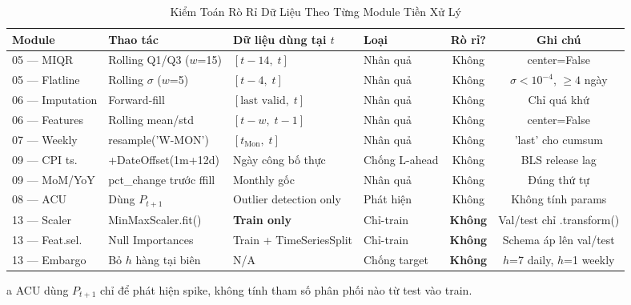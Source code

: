 \documentclass[conference]{IEEEtran}
\begin{document}
\begin{table}[t]
\caption{Kiểm Toán Rò Rỉ Dữ Liệu Theo Từng Module Tiền Xử Lý}
\label{tab:leakage_audit}
\centering
\begin{threeparttable}
\begin{tabular}{@{}llllcc@{}}
\toprule
\textbf{Module} & \textbf{Thao tác} & \textbf{Dữ liệu dùng tại $t$}
  & \textbf{Loại} & \textbf{Rò rỉ?} & \textbf{Ghi chú} \\
\midrule
05 --- MIQR      & Rolling Q1/Q3 ($w$=15)   & $[t{-}14,\;t]$             & Nhân quả     & Không & center=False \\
05 --- Flatline  & Rolling $\sigma$ ($w$=5)  & $[t{-}4,\;t]$              & Nhân quả     & Không & $\sigma < 10^{-4}$, $\geq 4$ ngày \\
06 --- Imputation& Forward-fill             & $[\text{last valid},\;t]$  & Nhân quả     & Không & Chỉ quá khứ \\
06 --- Features  & Rolling mean/std          & $[t{-}w,\;t{-}1]$          & Nhân quả     & Không & center=False \\
07 --- Weekly    & resample('W-MON')         & $[t_\text{Mon},\;t]$       & Nhân quả     & Không & 'last' cho cumsum \\
09 --- CPI ts.   & +DateOffset(1m+12d)       & Ngày công bố thực          & Chống L-ahead& Không & BLS release lag \\
09 --- MoM/YoY   & pct\_change trước ffill  & Monthly gốc                & Nhân quả     & Không & Đúng thứ tự \\
08 --- ACU       & Dùng $P_{t+1}$           & Outlier detection only     & Phát hiện    & Không\tnote{a} & Không tính params \\
13 --- Scaler    & MinMaxScaler.fit()        & \textbf{Train only}        & Chỉ-train    & \textbf{Không} & Val/test chỉ .transform() \\
13 --- Feat.sel. & Null Importances          & Train + TimeSeriesSplit    & Chỉ-train    & \textbf{Không} & Schema áp lên val/test \\
13 --- Embargo   & Bỏ $h$ hàng tại biên     & N/A                        & Chống target & \textbf{Không} & $h$=7 daily, $h$=1 weekly \\
\bottomrule
\end{tabular}
\begin{tablenotes}
\footnotesize
\item[a] ACU dùng $P_{t+1}$ chỉ để phát hiện spike,
không tính tham số phân phối nào từ test vào train.
\end{tablenotes}
\end{threeparttable}
\end{table}
\end{document}
